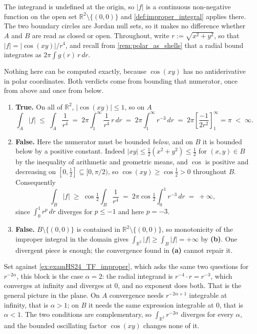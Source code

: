 \begin{exercisesolution}
\label{sol:improper_cos_over_r4}
The integrand is undefined at the origin, so $\lvert f\rvert$ is a continuous non-negative function
on the open set $\mathbb{R}^2\setminus\{(0,0)\}$ and \cref{def:improper_integral} applies there.
The two boundary circles are Jordan null sets, so it makes no difference whether $A$ and $B$ are
read as closed or open. Throughout, write $r := \sqrt{x^2+y^2}$, so that $\lvert f\rvert =
\lvert\cos(xy)\rvert/r^4$, and recall from \cref{rem:polar_as_shells} that a radial bound
integrates as $2\pi\int g(r)\,r\,dr$.

Nothing here can be computed exactly, because $\cos(xy)$ has no antiderivative in polar
coordinates. Both verdicts come from bounding that numerator, once from above and once from below.
\begin{enumerate}[label=\textbf{(\alph*)}]
  \item \textbf{True.} On all of $\mathbb{R}^2$, $\lvert\cos(xy)\rvert \leq 1$, so on $A$
    \[\int_A \lvert f\rvert \;\leq\; \int_A \frac{1}{r^4}
      \;=\; 2\pi\int_1^\infty \frac{1}{r^4}\,r\,dr
      \;=\; 2\pi\int_1^\infty r^{-3}\,dr
      \;=\; 2\pi\left[\frac{-1}{2r^2}\right]_1^\infty = \pi \;<\; \infty .\]
  \item \textbf{False.} Here the numerator must be bounded \emph{below}, and on $B$ it is bounded
    below by a positive constant. Indeed $\lvert xy\rvert \leq \tfrac12(x^2+y^2) \leq \tfrac12$ for
    $(x,y) \in B$ by the inequality of arithmetic and geometric means, and $\cos$ is positive and
    decreasing on $[0,\tfrac12] \subseteq [0,\pi/2)$, so $\cos(xy) \geq \cos\tfrac12 > 0$
    throughout $B$. Consequently
    \[\int_B \lvert f\rvert \;\geq\; \cos\tfrac12 \int_B \frac{1}{r^4}
      \;=\; 2\pi\cos\tfrac12 \int_0^1 r^{-3}\,dr \;=\; +\infty,\]
    since $\int_0^1 r^p\,dr$ diverges for $p \leq -1$ and here $p = -3$.
  \item \textbf{False.} $B \setminus\{(0,0)\}$ is contained in $\mathbb{R}^2\setminus\{(0,0)\}$, so
    monotonicity of the improper integral in the domain gives
    $\int_{\mathbb{R}^2}\lvert f\rvert \geq \int_B \lvert f\rvert = +\infty$ by \textbf{(b)}. One
    divergent piece is enough; the convergence found in \textbf{(a)} cannot repair it.
\end{enumerate}
\begin{remark}
Set against \cref{ex:examHS24_TF_improper}, which asks the same two questions for
$r^{-2\alpha}$, this block is the case $\alpha = 2$: the radial integrand is $r^{-4}\cdot r =
r^{-3}$, which converges at infinity and diverges at $0$, and no exponent does both. That is the
general picture in the plane. On $A$ convergence needs $r^{-2\alpha+1}$ integrable at infinity,
that is $\alpha > 1$; on $B$ it needs the same expression integrable at $0$, that is $\alpha < 1$.
The two conditions are complementary, so $\int_{\mathbb{R}^2}r^{-2\alpha}$ diverges for every
$\alpha$, and the bounded oscillating factor $\cos(xy)$ changes none of it.
\end{remark}
\end{exercisesolution}

